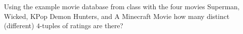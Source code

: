 
Using the example movie database from class with the four movies Superman, Wicked, KPop Demon Hunters, and A Minecraft Movie how many distinct (different) $4$-tuples of ratings are there? 
